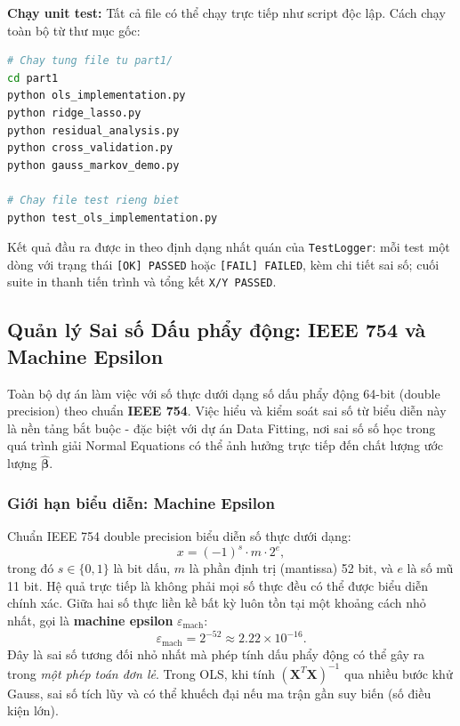 \textbf{Chạy unit test:} Tất cả file có thể chạy trực tiếp như script độc lập. Cách chạy toàn bộ từ thư mục gốc:

\begin{lstlisting}[language=bash, caption={Lệnh chạy toàn bộ unit test từ thư mục gốc}]
# Chay tung file tu part1/
cd part1
python ols_implementation.py
python ridge_lasso.py
python residual_analysis.py
python cross_validation.py
python gauss_markov_demo.py

# Chay file test rieng biet
python test_ols_implementation.py
\end{lstlisting}

Kết quả đầu ra được in theo định dạng nhất quán của \texttt{TestLogger}: mỗi test một dòng với trạng thái \textcolor{green!60!black}{\texttt{[OK] PASSED}} hoặc \textcolor{red!70!black}{\texttt{[FAIL] FAILED}}, kèm chi tiết sai số; cuối suite in thanh tiến trình và tổng kết \texttt{X/Y PASSED}.


\subsection{Quản lý Sai số Dấu phẩy động: IEEE 754 và Machine Epsilon}
\label{sec:floating_point_p2}

Toàn bộ dự án làm việc với số thực dưới dạng số dấu phẩy động 64-bit (double precision) theo chuẩn \textbf{IEEE 754}. Việc hiểu và kiểm soát sai số từ biểu diễn này là nền tảng bắt buộc - đặc biệt với dự án Data Fitting, nơi sai số số học trong quá trình giải Normal Equations có thể ảnh hưởng trực tiếp đến chất lượng ước lượng $\hat{\boldsymbol{\beta}}$.

\subsubsection{Giới hạn biểu diễn: Machine Epsilon}

Chuẩn IEEE 754 double precision biểu diễn số thực dưới dạng:
\begin{equation}
    x = (-1)^s \cdot m \cdot 2^e,
\end{equation}
trong đó $s \in \{0,1\}$ là bit dấu, $m$ là phần định trị (mantissa) 52 bit, và $e$ là số mũ 11 bit. Hệ quả trực tiếp là không phải mọi số thực đều có thể được biểu diễn chính xác. Giữa hai số thực liền kề bất kỳ luôn tồn tại một khoảng cách nhỏ nhất, gọi là \textbf{machine epsilon} $\varepsilon_\text{mach}$:
\begin{equation}
    \varepsilon_\text{mach} = 2^{-52} \approx 2.22 \times 10^{-16}.
\end{equation}
Đây là sai số tương đối nhỏ nhất mà phép tính dấu phẩy động có thể gây ra trong \emph{một phép toán đơn lẻ}. Trong OLS, khi tính $(\mathbf{X}^T\mathbf{X})^{-1}$ qua nhiều bước khử Gauss, sai số tích lũy và có thể khuếch đại nếu ma trận gần suy biến (số điều kiện lớn).

